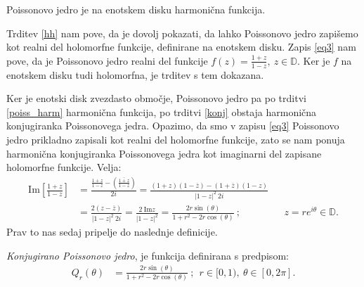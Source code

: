 \documentclass[mat1]{fmfdelo}
\begin{document}
    \begin{trditev}
        \label{poiss_harm}
        Poissonovo jedro je na enotskem disku harmonična funkcija. 
    \end{trditev}
    \begin{dokaz}
        Trditev \ref{hh} nam pove, da je dovolj pokazati, da lahko Poissonovo jedro zapišemo kot realni del holomorfne funkcije, definirane na enotskem disku.
        Zapis \eqref{eq3} nam pove, da je Poissonovo jedro realni del funkcije $f(z) = \frac{1 + z}{1 - z},~z \in \mathbb{D}$. Ker je $f$ na enotskem disku tudi holomorfna, je trditev s tem dokazana. 
    \end{dokaz}

    Ker je enotski disk zvezdasto območje, Poissonovo jedro pa po trditvi \ref{poiss_harm} harmonična funkcija, po trditvi \ref{konj} obstaja harmonična konjugiranka Poissonovega jedra. 
    Opazimo, da smo v zapisu \eqref{eq3} Poissonovo jedro prikladno zapisali kot realni del holomorfne funkcije, zato se nam ponuja harmonična konjugiranka Poissonovega jedra kot imaginarni del zapisane holomorfne funkcije.
    Velja:
    \begin{align*}
        \text{Im}\left[\frac{1 + z}{1-z}\right] &= \frac{\frac{1 + z}{1-z} - \left(\overline{\frac{1 + z}{1-z}}\right)}{2i} = \frac{(1 + z)(1 - \overline{z}) - (1 + \overline{z})(1 - z)}{|1 - z|^2~2i} & & \\ 
        & = \frac{2 (z - \overline{z})}{|1 - z|^2~2i} = \frac{2~\text{Im}z}{|1 - z|^2} = \frac{2 r \sin(\theta)}{1+ r^2 - 2r \cos(\theta)}~; & & z = r e^{i\theta} \in \mathbb{D}.
    \end{align*}
    Prav to nas sedaj pripelje do naslednje definicije. 
    \begin{definicija}
        \emph{Konjugirano Poissonovo jedro}, je funkcija definirana s predpisom:
        \begin{align}
            Q_r(\theta) & = \frac{2 r \sin(\theta)}{1+ r^2 - 2r \cos(\theta)}~;~~r \in [0,1),~\theta \in [0,2\pi].
        \end{align}
    \end{definicija}

\end{document}
